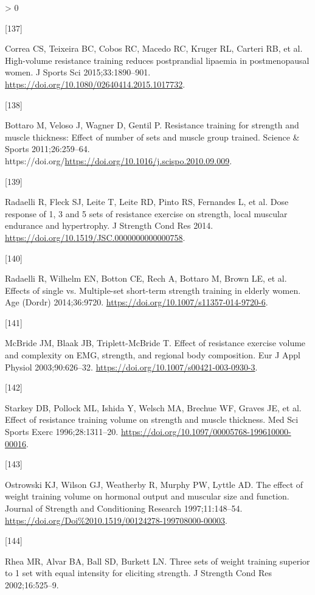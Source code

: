 \documentclass[twoside,10pt]{gihclass} %
\newlength{\cslhangindent}
\newlength{\csllabelwidth}
\newenvironment{CSLReferences}[3] %
 {%
  \setlength{\parindent}{0pt}
  \ifodd #1 \everypar{\setlength{\hangindent}{\cslhangindent}}\ignorespaces\fi
  \ifnum #2 > 0
  \setlength{\parskip}{#2\baselineskip}
  \fi
 }%
 {}
\newcommand{\CSLLeftMargin}[1]{\parbox[t]{\maxof{\widthof{#1}}{\csllabelwidth}}{#1}}
\newcommand{\CSLRightInline}[1]{\parbox[t]{\linewidth}{#1}}
\begin{document}
\begin{CSLReferences}{0}{0}
\leavevmode\hypertarget{ref-RN2464}{}%
\CSLLeftMargin{{[}137{]} }
\CSLRightInline{Correa CS, Teixeira BC, Cobos RC, Macedo RC, Kruger RL, Carteri RB, et al. High-volume resistance training reduces postprandial lipaemia in postmenopausal women. J Sports Sci 2015;33:1890--901. \url{https://doi.org/10.1080/02640414.2015.1017732}.}

\leavevmode\hypertarget{ref-RN2463}{}%
\CSLLeftMargin{{[}138{]} }
\CSLRightInline{Bottaro M, Veloso J, Wagner D, Gentil P. Resistance training for strength and muscle thickness: Effect of number of sets and muscle group trained. Science \& Sports 2011;26:259--64. https://doi.org/\url{https://doi.org/10.1016/j.scispo.2010.09.009}.}

\leavevmode\hypertarget{ref-RN1570}{}%
\CSLLeftMargin{{[}139{]} }
\CSLRightInline{Radaelli R, Fleck SJ, Leite T, Leite RD, Pinto RS, Fernandes L, et al. Dose response of 1, 3 and 5 sets of resistance exercise on strength, local muscular endurance and hypertrophy. J Strength Cond Res 2014. \url{https://doi.org/10.1519/JSC.0000000000000758}.}

\leavevmode\hypertarget{ref-RN1518}{}%
\CSLLeftMargin{{[}140{]} }
\CSLRightInline{Radaelli R, Wilhelm EN, Botton CE, Rech A, Bottaro M, Brown LE, et al. Effects of single vs. Multiple-set short-term strength training in elderly women. Age (Dordr) 2014;36:9720. \url{https://doi.org/10.1007/s11357-014-9720-6}.}

\leavevmode\hypertarget{ref-RN1474}{}%
\CSLLeftMargin{{[}141{]} }
\CSLRightInline{McBride JM, Blaak JB, Triplett-McBride T. Effect of resistance exercise volume and complexity on EMG, strength, and regional body composition. Eur J Appl Physiol 2003;90:626--32. \url{https://doi.org/10.1007/s00421-003-0930-3}.}

\leavevmode\hypertarget{ref-RN1456}{}%
\CSLLeftMargin{{[}142{]} }
\CSLRightInline{Starkey DB, Pollock ML, Ishida Y, Welsch MA, Brechue WF, Graves JE, et al. Effect of resistance training volume on strength and muscle thickness. Med Sci Sports Exerc 1996;28:1311--20. \url{https://doi.org/10.1097/00005768-199610000-00016}.}

\leavevmode\hypertarget{ref-RN1454}{}%
\CSLLeftMargin{{[}143{]} }
\CSLRightInline{Ostrowski KJ, Wilson GJ, Weatherby R, Murphy PW, Lyttle AD. The effect of weight training volume on hormonal output and muscular size and function. Journal of Strength and Conditioning Research 1997;11:148--54. \url{https://doi.org/Doi\%2010.1519/00124278-199708000-00003}.}

\leavevmode\hypertarget{ref-RN1384}{}%
\CSLLeftMargin{{[}144{]} }
\CSLRightInline{Rhea MR, Alvar BA, Ball SD, Burkett LN. Three sets of weight training superior to 1 set with equal intensity for eliciting strength. J Strength Cond Res 2002;16:525--9.}


\end{CSLReferences}
\end{document}
